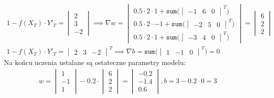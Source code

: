 \documentclass[
    left=2.5cm,         %
    right=2.5cm,        %
    top=2.5cm,          %
    bottom=3cm,         %
    bindingoffset=6mm,  %
    nohyphenation=false %
]{eiti/eiti-report}
\begin{document}
\begin{gather*}
    1-f(X_T)\cdot Y'_T = \begin{vmatrix}
        2\\
        3\\
        -2
    \end{vmatrix} \implies
    \nabla w = \begin{vmatrix}
        0.5 \cdot 2 \cdot 1 + \texttt{sum(}\begin{vmatrix}
        -1 &
        6 &
        0
    \end{vmatrix}^T\texttt{)}\\
        0.5 \cdot 2 \cdot -1 + \texttt{sum(}\begin{vmatrix}
        -2 &
        5 &
        0
    \end{vmatrix}^T\texttt{)}\\
        0.5 \cdot 2 \cdot 1 + \texttt{sum(}\begin{vmatrix}
        -3 &
        4 &
        0
    \end{vmatrix}^T\texttt{)}
    \end{vmatrix} = \begin{vmatrix}
        6\\
        2\\
        2
    \end{vmatrix}\\
    1-f(X_T)\cdot Y'_T = \begin{vmatrix}
        2 &
        3 &
        -2
    \end{vmatrix}^T \implies
    \nabla b = \texttt{sum(}\begin{vmatrix}
        1 &
        -1 &
        0
    \end{vmatrix}^T\texttt{)} = 0
\end{gather*}
Na końcu uczenia ustalane są ostateczne parametry modelu:
\begin{gather*}
    w = 
        \begin{vmatrix}
            1\\
            -1\\
            1
        \end{vmatrix} - 0.2 \cdot \begin{vmatrix}
            6\\
            2\\
            2
        \end{vmatrix} = \begin{vmatrix}
            -0.2\\
            -1.4\\
            0.6
        \end{vmatrix}
    , b =
    3 - 0.2 \cdot 0 = 3
\end{gather*}
\end{document}
